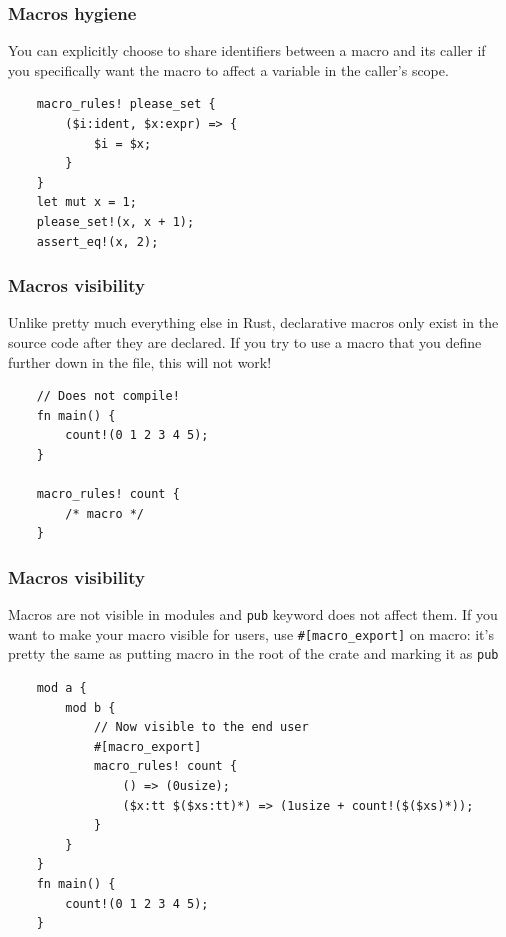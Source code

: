 \documentclass[aspectratio=1610,t]{beamer}
\begin{document}

\begin{frame}[fragile]
\frametitle{Macros hygiene}
You can explicitly choose to share identifiers between a macro and its caller if you specifically want the macro to affect a variable in the caller’s scope.

\begin{verbatim}
    macro_rules! please_set {
        ($i:ident, $x:expr) => {
            $i = $x;
        }
    }
    let mut x = 1;
    please_set!(x, x + 1);
    assert_eq!(x, 2);
\end{verbatim}
\end{frame}


\begin{frame}[fragile]
\frametitle{Macros visibility}
Unlike pretty much everything else in Rust, declarative macros only exist in the source code after they are declared. If you try to use a macro that you define further down in the file, this will not work!

\begin{verbatim}
    // Does not compile!
    fn main() {
        count!(0 1 2 3 4 5);
    }

    macro_rules! count {
        /* macro */
    }
\end{verbatim}
\end{frame}


\begin{frame}[fragile]
\frametitle{Macros visibility}
Macros are not visible in modules and \texttt{pub} keyword does not affect them. If you want to make your macro visible for users, use \texttt{\#[macro\_export]} on macro: it's pretty the same as putting macro in the root of the crate and marking it as \texttt{pub}

\begin{verbatim}
    mod a {
        mod b {
            // Now visible to the end user
            #[macro_export]
            macro_rules! count {
                () => (0usize);
                ($x:tt $($xs:tt)*) => (1usize + count!($($xs)*));
            }
        }
    }
    fn main() {
        count!(0 1 2 3 4 5);
    }
\end{verbatim}
\end{frame}
\end{document}
